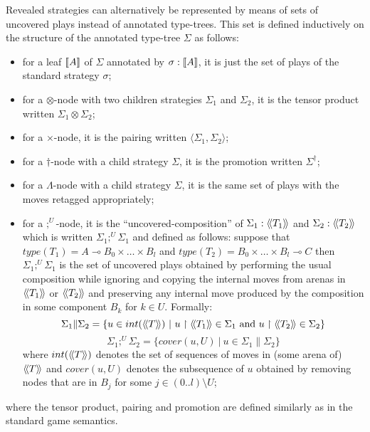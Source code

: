 Revealed strategies can alternatively be represented by means of
sets of uncovered plays instead of annotated type-trees. This set is
defined inductively on the structure of the annotated type-tree
$\Sigma$ as follows:
\begin{itemize}
\item for a leaf ${[\![ A ]\!]}$ of $\Sigma$ annotated by $\sigma :{[\![ A ]\!]}$, it is just the set of plays of the standard strategy $\sigma$;
\item for a $\otimes$-node with two children strategies $\Sigma_1$ and $\Sigma_2$, it is the tensor product written $\Sigma_1 \otimes \Sigma_2$;
\item for a $\times$-node, it is the pairing written $\langle \Sigma_1, \Sigma_2 \rangle$;
\item for a $\dagger$-node with a child strategy $\Sigma$, it is the promotion written $\Sigma^\dagger$;
\item for a $\Lambda$-node with a child strategy $\Sigma$, it is the same set of plays with the moves retagged appropriately;

\item for a $;^U$-node, it is the ``uncovered-composition'' of $\Sigma_1 : {\langle\!\langle T_1 \rangle\!\rangle}$ and $\Sigma_2 :{\langle\!\langle T_2 \rangle\!\rangle}$ which is written $\Sigma_1
;^U \Sigma_1$ and defined as follows: suppose that $type(T_1) = A
\multimap B_0 \times \ldots \times B_l$ and $type(T_2) = B_0 \times
\ldots \times B_l \multimap C$ then $\Sigma_1 ;^U \Sigma_1$ is the
set of uncovered plays obtained by performing the usual composition
while ignoring and copying the internal moves from arenas in
${\langle\!\langle T_1 \rangle\!\rangle}$ or ${\langle\!\langle T_2 \rangle\!\rangle}$ and preserving any internal
move produced by the composition in some component $B_k$ for $k \in
U$. Formally:
$$ \Sigma_1 \| \Sigma_2 = \{ u \in int({\langle\!\langle T \rangle\!\rangle}) \ | \ u \upharpoonright {\langle\!\langle T_1 \rangle\!\rangle} \in \Sigma_1 \mbox{ and } u \upharpoonright {\langle\!\langle T_2 \rangle\!\rangle} \in \Sigma_2 \}$$
$$ \Sigma_1 ;^U \Sigma_2 = \{ cover(u,U) \ | \ u \in \Sigma_1 \| \Sigma_2 \}$$
where $int({\langle\!\langle T \rangle\!\rangle})$ denotes the set of sequences of moves in (some arena of) ${\langle\!\langle T \rangle\!\rangle}$
and $cover(u,U)$ denotes the subsequence of $u$ obtained by removing nodes that are in $B_j$ for some $j \in ( 0..l ) \setminus U$;
\end{itemize}
where the tensor product, pairing and promotion are defined similarly as in the standard game semantics.

